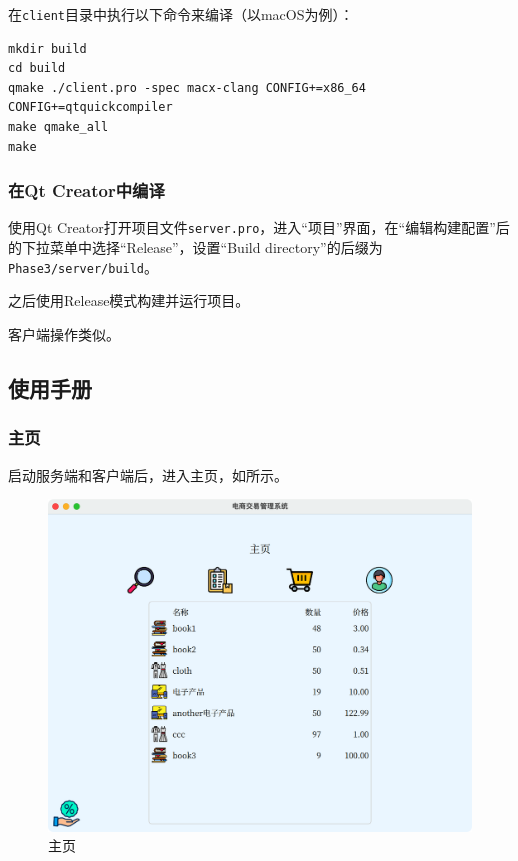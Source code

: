 \documentclass[lang=cn,11pt,a4paper,cite=authornum]{paper}
\begin{document}
在\texttt{client}目录中执行以下命令来编译（以macOS为例）：

\begin{code}
\begin{verbatim}
mkdir build
cd build
qmake ./client.pro -spec macx-clang CONFIG+=x86_64 CONFIG+=qtquickcompiler 
make qmake_all
make
\end{verbatim}
\end{code}

\subsubsection{在Qt Creator中编译}

使用Qt Creator打开项目文件\texttt{server.pro}，进入“项目”界面，在“编辑构建配置”后的下拉菜单中选择“Release”，设置“Build directory”的后缀为\texttt{Phase3/server/build}。

之后使用Release模式构建并运行项目。

客户端操作类似。

\subsection{使用手册}

\label{GUI}

\subsubsection{主页}

启动服务端和客户端后，进入主页，如所示。

\begin{figure}[htbp]
    \centering
    \includegraphics[width=0.7\linewidth]{./Images/home.png}
    \caption{主页\label{fig:home}}
\end{figure}
\end{document}
